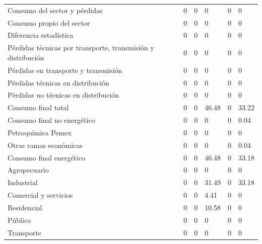 \documentclass{sener2025}
\begin{document}
\begin{tabladoradoLargo}
\begin{xltabular}{\textwidth}{YZZZZZ}
    Consumo del sector y pérdidas & 0 & 0 & 0 & 0 & 0 \\
    \hspace{1.35em} Consumo propio del sector & 0 & 0 & 0 & 0 & 0 \\
    \hspace{1.35em} Diferencia estadística & 0 & 0 & 0 & 0 & 0 \\
    \hspace{1.35em} Pérdidas técnicas por transporte, transmisión y distribución & 0 & 0 & 0 & 0 & 0 \\
    \hspace{2.7em} Pérdidas en transporte y transmisión & 0 & 0 & 0 & 0 & 0 \\
    \hspace{2.7em} Pérdidas técnicas en distribución & 0 & 0 & 0 & 0 & 0 \\
    \hspace{2.7em} Pérdidas no técnicas  en distribución & 0 & 0 & 0 & 0 & 0 \\
    Consumo final total & 0 & 0 & 46.48 & 0 & 33.22 \\
    \hspace{1.35em} Consumo final no energético & 0 & 0 & 0 & 0 & 0.04 \\
    \hspace{2.7em} Petroquímica Pemex & 0 & 0 & 0 & 0 & 0 \\
    \hspace{2.7em} Otras ramas económicas & 0 & 0 & 0 & 0 & 0.04 \\
    Consumo final energético & 0 & 0 & 46.48 & 0 & 33.18 \\
    \hspace{2.7em} Agropecuario & 0 & 0 & 0 & 0 & 0 \\
    \hspace{2.7em} Industrial & 0 & 0 & 31.49 & 0 & 33.18 \\
    \hspace{2.7em} Comercial y servicios & 0 & 0 & 4.41 & 0 & 0 \\
    \hspace{2.7em} Residencial & 0 & 0 & 10.58 & 0 & 0 \\
    \hspace{2.7em} Público & 0 & 0 & 0 & 0 & 0 \\
    \hspace{2.7em} Transporte & 0 & 0 & 0 & 0 & 0 \\
  \end{xltabular}


\end{tabladoradoLargo}
\end{document}
